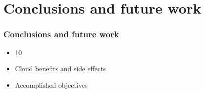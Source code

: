 \section{Conclusions and future work}

\begin{frame}%
\frametitle{Conclusions and future work}

\begin{itemize}
  \item 10
  \item Cloud benefits and side effects
  \item Accomplished objectives
\end{itemize}

\end{frame}